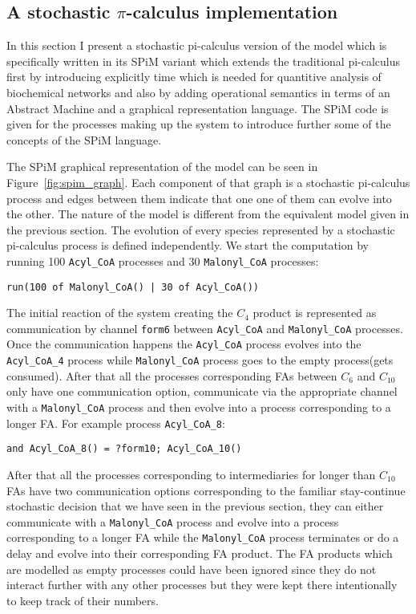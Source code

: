 \subsection{A stochastic $\pi$-calculus implementation}
In this section I present a stochastic pi-calculus version of the
model which is specifically written in its SPiM variant which extends
the traditional pi-calculus first by introducing explicitly time which
is needed for quantitive analysis of biochemical networks and also by
adding operational semantics in terms of an Abstract Machine and a
graphical representation language. The SPiM code is given for the
processes making up the system to introduce further some of the
concepts of the SPiM language.

The SPiM graphical representation of the model can be seen in
Figure~\ref{fig:spim_graph}. Each component of that graph is a
stochastic pi-calculus process and edges between them indicate that
one one of them can evolve into the other. The nature of the model is
different from the equivalent model given in the previous section. The
evolution of every species represented by a stochastic pi-calculus
process is defined independently. We start the computation by running 100
\texttt{Acyl\_CoA} processes and 30 \texttt{Malonyl\_CoA} processes:

\begin{verbatim}
run(100 of Malonyl_CoA() | 30 of Acyl_CoA())
\end{verbatim}

The initial reaction of the system creating the $C_4$ product is represented as
communication by channel \texttt{form6} between \texttt{Acyl\_CoA} and
\texttt{Malonyl\_CoA} processes. Once the communication happens the
\texttt{Acyl\_CoA} process evolves into the  \texttt{Acyl\_CoA\_4}
process while \texttt{Malonyl\_CoA} process goes to the empty
process(gets consumed). After that all the processes corresponding
FAs between $C_6$ and $C_{10}$ only have one communication option,
communicate via the appropriate channel with a \texttt{Malonyl\_CoA}
process and then evolve into a process corresponding to a longer
FA. For example process \texttt{Acyl\_CoA\_8}:

\begin{verbatim}
and Acyl_CoA_8() = ?form10; Acyl_CoA_10()
\end{verbatim}

After that all the processes corresponding to intermediaries for longer
than $C_{10}$ FAs have two communication options corresponding to the familiar
stay-continue stochastic decision that we have seen in the previous section, they
can either communicate with a \texttt{Malonyl\_CoA} process and evolve
into a process corresponding to a longer FA while the
\texttt{Malonyl\_CoA} process terminates or do a delay and evolve into
their corresponding FA product. The FA products which are modelled as
empty processes could have been ignored since they do not interact
further with any other processes but they were kept there
intentionally to keep track of their numbers.

